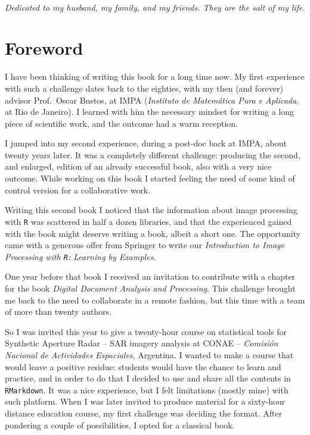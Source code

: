 \documentclass[a4paper]{tufte-book} %
\begin{document}

\cleardoublepage
~\vfill
\begin{doublespace}
\noindent\fontsize{18}{22}\selectfont\itshape
\nohyphenation
Dedicated to my husband, my family, and my friends. They are the salt of my life.
\end{doublespace}
\vfill
\vfill


\cleardoublepage
\chapter*{Foreword} %

I have been thinking of writing this book for a long time now.
My first experience with such a challenge dates back to the eighties, with my then (and forever) advisor Prof.\ Oscar Bustos, at IMPA (\textit{Instituto de Matem\'atica Pura e Aplicada}, at Rio de Janeiro).
I learned with him the necessary mindset for writing a long piece of scientific work, and the outcome had a warm reception\cite{BustosFrery:92:ABE}.

I jumped into my second experience, during a post-doc back at IMPA, about twenty years later.
It was a completely different challenge: producing the second, and enlarged, edition of an already successful book, also with a very nice outcome\cite{IPVG:2008}.
While working on this book I started feeling the need of some kind of control version for a collaborative work.

Writing this second book I noticed that the information about image processing with \texttt R\cite{Rmanual} was scattered in half a dozen libraries, and that the experienced gained with the book might deserve writing a book, albeit a short one.
The opportunity came with a generous offer from Springer to write our \textit{Introduction to Image Processing with \texttt R: Learning by Examples}\cite{IntroImageProcessingR}.

One year before that book I received an invitation to contribute with a chapter for the book \textit{Digital Document Analysis and Processing}\cite{DigitalDocumentAnalysisProcessing}.
This challenge brought me back to the need to collaborate in a remote fashion, but this time with a team of more than twenty authors.

So I was invited this year to give a twenty-hour course on statistical tools for Synthetic Aperture Radar -- SAR imagery analysis at CONAE -- \textit{Comisi\'on Nacional de Actividades Espaciales}, Argentina.
I wanted to make a course that would leave a positive residue:
students would have the chance to learn and practice, and in order to do that I decided to use and share all the contents in \texttt{RMarkdown}.
It was a nice experience, but I felt limitations (mostly mine) with such platform.
When I was later invited to produce material for a sixty-hour distance education course, my first challenge was deciding the format.
After pondering a couple of possibilities, I opted for a classical book.
\end{document}
